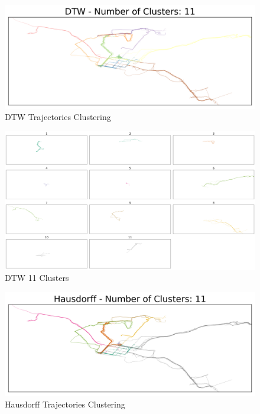 \documentclass[a4paper, 12pt]{article}
\begin{document}
\begin{figure}[htbp!]
    \centering
    \includegraphics[width=1\textwidth]{dtw_trajectory_clustering.png}
    \caption{DTW Trajectories Clustering}
    \label{fig23}
\end{figure}

\begin{figure}[htbp!]
    \centering
    \includegraphics[width=1\textwidth]{dtw_11_clusters.png}
    \caption{DTW 11 Clusters}
    \label{fig24}
\end{figure}

\begin{figure}[htbp!]
    \centering
    \includegraphics[width=1\textwidth]{hausdorff_trajectory_clustering.png}
    \caption{Hausdorff Trajectories Clustering}
    \label{fig25}
\end{figure}
\end{document}
